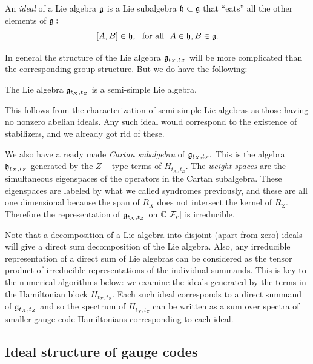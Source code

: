 \documentclass[12pt]{article}
\renewenvironment{framed}
{\begin{samepage}
\MakeFramed{\hsize0.8\linewidth\advance\hsize-\width\FrameRestore}}
{\endMakeFramed\end{samepage}}
\begin{document}
An \emph{ideal} of a Lie algebra $\mathfrak{g}$
is a Lie subalgebra $\mathfrak{h}\subset\mathfrak{g}$ that ``eats''
all the other elements of $\mathfrak{g}:$
$$
    [A, B] \in \mathfrak{h}, \ \ \mbox{for all}\ \  A\in\mathfrak{h}, B\in\mathfrak{g}.
$$

In general the structure of the Lie algebra $\mathfrak{g}_{t_X,t_Z}$ 
will be more complicated than the corresponding group structure.
But we do have the following:
\begin{framed}
The Lie algebra $\mathfrak{g}_{t_X,t_Z}$ is a semi-simple Lie algebra.
\end{framed}
This follows from the characterization of
semi-simple Lie algebras as those having no
nonzero abelian ideals.
Any such ideal would correspond to the existence of 
stabilizers, and we already got rid of these.

We also have a ready made \emph{Cartan subalgebra} of $\mathfrak{g}_{t_X,t_Z}.$ 
This is the algebra $\mathfrak{h}_{t_X,t_Z}$ generated by the $Z-$type terms of $H_{t_X,t_Z}.$
The \emph{weight spaces} are the simultaneous eigenspaces
of the operators in the Cartan subalgebra. These
eigenspaces are labeled by what we called syndromes previously,
and these are all one dimensional because the span of $R_X$ does
not intersect the kernel of $R_Z.$
Therefore the representation of 
$\mathfrak{g}_{t_X,t_Z}$ on $\mathbb{C}[\mathcal{F}_{r}]$ is irreducible.

Note that a decomposition of a Lie algebra
into disjoint (apart from zero)
ideals will give a direct sum decomposition of
the Lie algebra.
Also, any irreducible representation of a direct sum of Lie algebras can
be considered as the tensor product of irreducible representations of the
individual summands.
This is key to the numerical algorithms below:
we examine the ideals generated by
the terms in the Hamiltonian block $H_{t_X,t_Z}.$
Each such ideal corresponds to a direct summand of $\mathfrak{g}_{t_X,t_Z}$ 
and so the spectrum of  $H_{t_X,t_Z}$
can be written as a sum over spectra of smaller gauge code Hamiltonians
corresponding to each ideal.


\subsection{Ideal structure of gauge codes}
\end{document}
